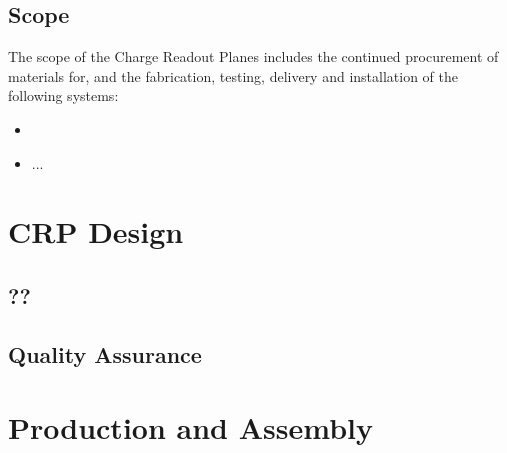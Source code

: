 

\subsection{Scope}
\label{sec:fddp-crp-scope}

The scope of the Charge Readout Planes includes the continued procurement of materials for, and the fabrication, testing, delivery and installation of the following systems: 


\begin{itemize}
\item  
\item  ...
\end{itemize}



\section{CRP Design}
\label{sec:fddp-crp-design}




\subsection{??}
\label{sec:fddp-crp-??}

\subsection{Quality Assurance}
\label{sec:fddp-crp-qa}




\section{Production and Assembly}
\label{sec:fddp-crp-prod-assy}

\subsection{}
\label{sec:fddp-crp-?}

